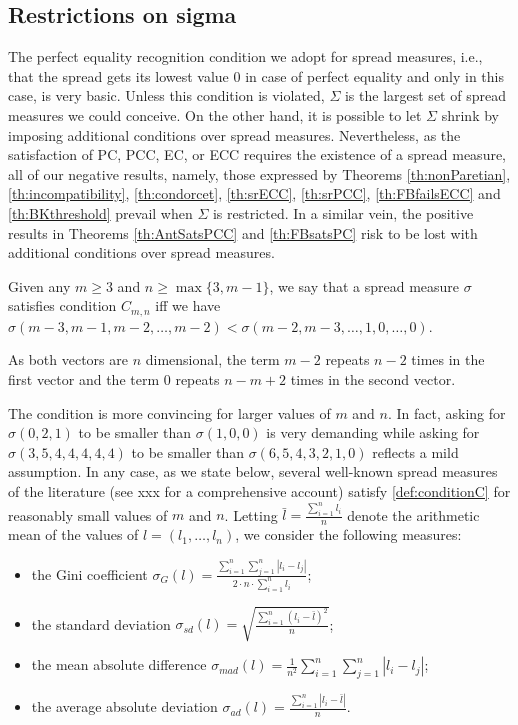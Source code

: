 \documentclass[version=3.21, pagesize, twoside=off, bibliography=totoc, DIV=calc, fontsize=12pt, a4paper]{scrartcl}
\begin{document}
\subsection{Restrictions on sigma}
\label{sec:RestrictionOnSigma}
The perfect equality recognition condition we adopt for spread measures, i.e., that the spread gets its lowest value $0$ in case of perfect equality and only in this case, is very basic. Unless this condition is violated, $\Sigma$ is the largest set of spread measures we could conceive. On the other hand, it is possible to let $\Sigma$ shrink by imposing additional conditions over spread measures. Nevertheless, as the satisfaction of PC, PCC, EC, or ECC requires the existence of a spread measure, all of our negative results, namely, those expressed by Theorems \ref{th:nonParetian}, \ref{th:incompatibility}, \ref{th:condorcet}, \ref{th:srECC}, \ref{th:srPCC}, \ref{th:FBfailsECC} and \ref{th:BKthreshold} prevail when $\Sigma$ is restricted. In a similar vein, the positive results in Theorems \ref{th:AntSatsPCC} and \ref{th:FBsatsPC} risk to be lost with additional conditions over spread measures.

\begin{definition}
	\label{def:conditionC}
	Given any $m\geq3$ and $n\geq \max\{3,m-1\}$, we say that a spread measure $\sigma$ satisfies condition $C_{m,n}$ iff we have $\sigma(m-3, m-1, m-2, \dots, m-2) < \sigma(m-2, m-3, \dots, 1, 0, \dots, 0)$.
\end{definition}

As both vectors are $n$ dimensional, the term $m-2$ repeats $n-2$ times in the first vector and the term $0$ repeats $n-m+2$ times in the second vector.

The condition is more convincing for larger values of $m$ and $n$. In fact, asking for $\sigma(0,2,1)$ to be smaller than $\sigma(1,0,0)$ is very demanding while asking for $\sigma(3,5,4,4,4,4,4)$ to be smaller than $\sigma(6,5,4,3,2,1,0)$ reflects a mild assumption. In any case, as we state below, several well-known spread measures of the literature (see xxx for a comprehensive account) satisfy \cref{def:conditionC} for reasonably small values of $m$ and $n$. Letting $\bar{l}=\frac{\sum_{i=1}^{n}l_i}{n}$ denote the arithmetic mean of the values of $l = (l_1, …, l_n)$, we consider the following measures:

\begin{itemize}
	\item the Gini coefficient $\sigma_{G}(l)= \frac{\sum_{i=1}^{n}\sum_{j=1}^{n}|l_i-l_j|}{2 \cdot n \cdot \sum_{i=1}^{n} l_i}$;
	\item the standard deviation $\sigma_{sd}(l)= \sqrt{\frac{\sum_{i=1}^{n}(l_i-\bar{l})^2}{n}}$;
	\item the mean absolute difference $\sigma_{mad}(l)= \frac{1}{n^2} \sum_{i=1}^{n}\sum_{j=1}^{n}|l_i-l_j|$;
	\item the average absolute deviation $\sigma_{ad}(l)= \frac{\sum_{i=1}^{n}|l_i-\bar{l}|}{n}$.
\end{itemize} 
\end{document}
